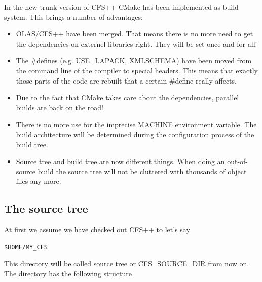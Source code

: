 In the new trunk version of CFS++ CMake has been implemented as build system. This brings a number of advantages:

\begin{itemize}
    \item OLAS/CFS++ have been merged. That means there is no more need to get the dependencies on externel libraries right. They will be set once and for all!
    \item The \#defines (e.g. USE\_LAPACK, XMLSCHEMA) have been moved from the command line of the compiler to special headers. This means that exactly those parts of the code are rebuilt that a certain \#define really affects.
    \item Due to the fact that CMake takes care about the dependencies, parallel builds are back on the road!
    \item There is no more use for the imprecise MACHINE environment variable. The build architecture will be determined during the configuration process of the build tree.
    \item Source tree and build tree are now different things. When doing an out-of-source build the source tree will not be cluttered with thousands of object files any more. 
\end{itemize}

\subsection{The source tree}

At first we assume we have checked out CFS++ to let's say

\begin{verbatim}
$HOME/MY_CFS
\end{verbatim}

This directory will be called source tree or CFS\_SOURCE\_DIR from now on. The directory has the following structure

